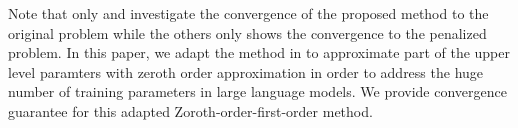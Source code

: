   Note that only \cite{LiuLYZZ24} and \cite{LuMei24} investigate the convergence of the proposed method to the original problem while the others only shows the convergence to the penalized problem.  In this paper, we adapt the method in \cite{LuMei24} to approximate part of the upper level paramters with zeroth order approximation in order to address the huge number of training parameters in large language models. We provide convergence guarantee for this adapted Zoroth-order-first-order method.